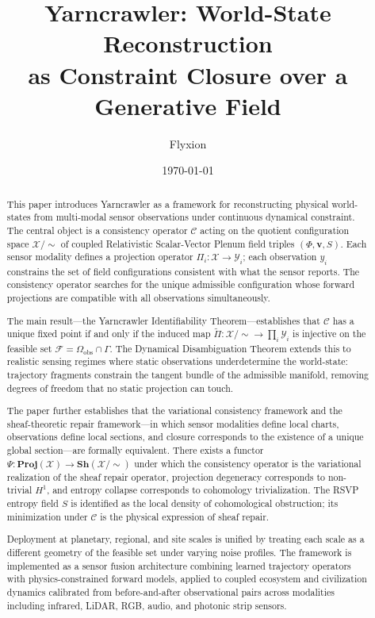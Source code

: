 \documentclass[11pt, oneside]{article}
\title{%
  \Large\textbf{Yarncrawler: World-State Reconstruction}\\[6pt]
  \large\textbf{as Constraint Closure over a Generative Field}
}
\author{Flyxion}
\date{\today}
\newcommand{\Xmod}{\mathcal{X}/{\sim}}
\begin{document}
\maketitle

\begin{abstract}
This paper introduces Yarncrawler as a framework for reconstructing physical world-states
from multi-modal sensor observations under continuous dynamical constraint. The central
object is a consistency operator $\mathcal{C}$ acting on the quotient configuration space
$\mathcal{X}/{\sim}$ of coupled Relativistic Scalar-Vector Plenum field triples
$(\Phi, \mathbf{v}, S)$. Each sensor modality defines a projection operator
$\Pi_i : \mathcal{X} \to \mathcal{Y}_i$; each observation $y_i$ constrains the set of
field configurations consistent with what the sensor reports. The consistency operator
searches for the unique admissible configuration whose forward projections are compatible
with all observations simultaneously.

The main result---the Yarncrawler Identifiability Theorem---establishes that $\mathcal{C}$
has a unique fixed point if and only if the induced map
$\widetilde{\Pi} : \Xmod \to \prod_i \mathcal{Y}_i$ is injective on the feasible set
$\mathcal{F} = \Omega_{\mathrm{obs}} \cap \Gamma$. The Dynamical Disambiguation Theorem
extends this to realistic sensing regimes where static observations underdetermine the
world-state: trajectory fragments constrain the tangent bundle of the admissible manifold,
removing degrees of freedom that no static projection can touch.

The paper further establishes that the variational consistency framework and the
sheaf-theoretic repair framework---in which sensor modalities define local charts, observations
define local sections, and closure corresponds to the existence of a unique global
section---are formally equivalent. There exists a functor
$\Psi : \mathbf{Proj}(\mathcal{X}) \to \mathbf{Sh}(\Xmod)$ under which the consistency
operator is the variational realization of the sheaf repair operator, projection degeneracy
corresponds to non-trivial $H^1$, and entropy collapse corresponds to cohomology
trivialization. The RSVP entropy field $S$ is identified as the local density of
cohomological obstruction; its minimization under $\mathcal{C}$ is the physical expression
of sheaf repair.

Deployment at planetary, regional, and site scales is unified by treating each scale as a
different geometry of the feasible set under varying noise profiles. The framework is
implemented as a sensor fusion architecture combining learned trajectory operators with
physics-constrained forward models, applied to coupled ecosystem and civilization dynamics
calibrated from before-and-after observational pairs across modalities including infrared,
LiDAR, RGB, audio, and photonic strip sensors.
\end{abstract}
\newpage
\end{document}
